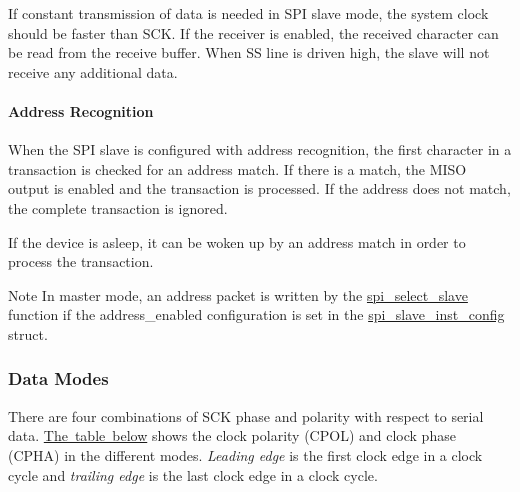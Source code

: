 If constant transmission of data is needed in S\+PI slave mode, the system clock should be faster than S\+CK. If the receiver is enabled, the received character can be read from the receive buffer. When SS line is driven high, the slave will not receive any additional data.\hypertarget{group__asfdoc__sam0__sercom__spi__group_asfdoc_sam0_sercom_spi_slave_mode_addr_recognition}{}\paragraph{Address Recognition}\label{group__asfdoc__sam0__sercom__spi__group_asfdoc_sam0_sercom_spi_slave_mode_addr_recognition}
When the S\+PI slave is configured with address recognition, the first character in a transaction is checked for an address match. If there is a match, the M\+I\+SO output is enabled and the transaction is processed. If the address does not match, the complete transaction is ignored.

If the device is asleep, it can be woken up by an address match in order to process the transaction.

\begin{DoxyNote}{Note}
In master mode, an address packet is written by the \mbox{\hyperlink{group__asfdoc__sam0__sercom__spi__group_gaff6f75d83ec5251e6d1d42830b8af05f}{spi\+\_\+select\+\_\+slave}} function if the address\+\_\+enabled configuration is set in the \mbox{\hyperlink{structspi__slave__inst__config}{spi\+\_\+slave\+\_\+inst\+\_\+config}} struct.
\end{DoxyNote}
\hypertarget{group__asfdoc__sam0__sercom__spi__group_asfdoc_sam0_sercom_spi_data_modes}{}\subsubsection{Data Modes}\label{group__asfdoc__sam0__sercom__spi__group_asfdoc_sam0_sercom_spi_data_modes}
There are four combinations of S\+CK phase and polarity with respect to serial data. \mbox{\hyperlink{group__asfdoc__sam0__sercom__spi__group_asfdoc_sam0_spi_mode_table}{The table below}} shows the clock polarity (C\+P\+OL) and clock phase (C\+P\+HA) in the different modes. {\itshape Leading edge} is the first clock edge in a clock cycle and {\itshape trailing edge} is the last clock edge in a clock cycle.

\label{group__asfdoc__sam0__sercom__spi__group_asfdoc_sam0_spi_mode_table}%
%

